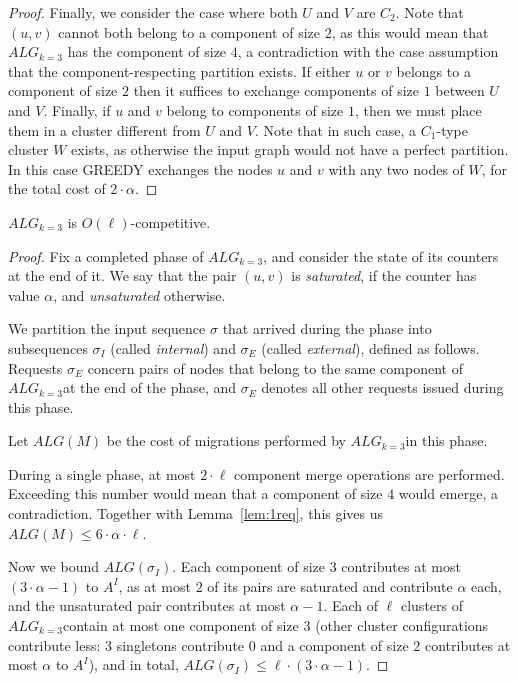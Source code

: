 \documentclass[manuscript,screen=true]{acmart}
\newcommand{\TAlg}{{\ensuremath{ALG_{k=3}}}} %
\begin{document}
\begin{appendix}
\begin{proof}
      Finally, we consider the case where both $U$ and $V$ are $C_2$. Note that $(u,v)$ cannot both belong to a component of size $2$, as this would mean that \TAlg{} has the component of size $4$, a contradiction with the case assumption that the component-respecting partition exists. 
      If either $u$ or $v$ belongs to a component of size $2$ then it suffices to exchange components of size $1$ between $U$ and $V$.
      Finally, if $u$ and $v$ belong to components of size $1$, then we must place them in a cluster different from $U$ and $V$.
      Note that in such case, a $C_1$-type cluster $W$ exists, as otherwise the input graph would not have a perfect partition. In this case GREEDY exchanges the nodes $u$ and $v$ with any two nodes of $W$, for the total cost of $2\cdot \alpha$.
  \end{proof}
  
  
  \begin{theorem}
    \TAlg{} is $O(\ell)$-competitive.
  \end{theorem}
  \begin{proof}
    Fix a completed phase of \TAlg, and consider the state of its counters at the end of it.
    We say that the pair $(u, v)$ is \emph{saturated}, if the counter has value $\alpha$, and \emph{unsaturated} otherwise.

    We partition the input sequence $\sigma$ that arrived during the phase into subsequences $\sigma_I$ (called \emph{internal}) and $\sigma_E$ (called \emph{external}), defined as follows.
    Requests $\sigma_E$ concern pairs of nodes that belong to the same component of \TAlg at the end of the phase, and $\sigma_E$ denotes all other requests issued during this phase.

    Let $ALG(M)$ be the cost of migrations performed by \TAlg in this phase.

    

    During a single phase, at most $2\cdot \ell$ component merge operations are performed.
    Exceeding this number would mean that a component of size $4$ would emerge, a contradiction.
    Together with Lemma~\ref{lem:1req}, this gives us $ALG(M) \leq 6\cdot\alpha\cdot\ell$.
    
    Now we bound $ALG(\sigma_I)$.
    Each component of size $3$ contributes at most $(3\cdot \alpha - 1)$ to $A^I$, as at most $2$ of its pairs are saturated and contribute $\alpha$ each, and the unsaturated pair contributes at most $\alpha-1$.
    Each of $\ell$ clusters of \TAlg contain at most one component of size $3$ (other cluster configurations contribute less: $3$ singletons contribute $0$ and a component of size $2$ contributes at most $\alpha$ to $A^I$), and in total, $ALG(\sigma_I) \leq \ell \cdot (3\cdot \alpha-1)$.


\end{proof}
\end{appendix}
\end{document}
